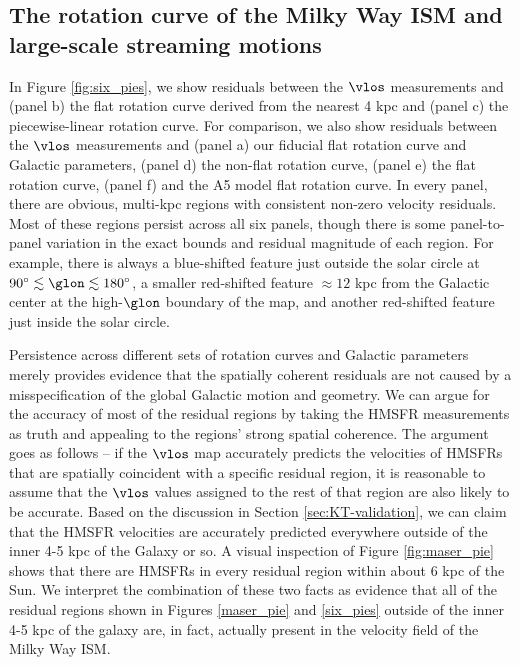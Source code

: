 \subsection{The rotation curve of the Milky Way ISM and large-scale streaming motions}
\label{sec:rotation_discussion}
In Figure \ref{fig:six_pies}, we show residuals between the $\vlos$ measurements and (panel b) the flat rotation curve derived from the nearest 4 kpc and (panel c) the piecewise-linear rotation curve. 
For comparison, we also show residuals between the $\vlos$ measurements and (panel a) our fiducial flat rotation curve and Galactic parameters, (panel d) the \Clemens non-flat rotation curve, (panel e) the \cite{2012ApJ...759..131B} flat rotation curve, (panel f) and the \Reid A5 model flat rotation curve.
In every panel, there are obvious, multi-kpc regions with consistent non-zero velocity residuals.
Most of these regions persist across all six panels, though there is some panel-to-panel variation in the exact bounds and residual magnitude of each region. 
For example, there is always a blue-shifted feature just outside the solar circle at $90^\circ \lesssim \glon \lesssim 180^\circ$, a smaller red-shifted feature $\approx 12$ kpc from the Galactic center at the high-$\glon$ boundary of the map, and another red-shifted feature just inside the solar circle. 

Persistence across different sets of rotation curves and Galactic parameters merely provides evidence that the spatially coherent residuals are not caused by a misspecification of the global Galactic motion and geometry.
We can argue for the accuracy of most of the residual regions by taking the HMSFR measurements as truth and appealing to the regions' strong spatial coherence.
The argument goes as follows -- if the $\vlos$ map accurately predicts the velocities of HMSFRs that are spatially coincident with a specific residual region, it is reasonable to assume that the $\vlos$ values assigned to the rest of that region are also likely to be accurate. 
Based on the discussion in Section \ref{sec:KT-validation}, we can claim that the HMSFR velocities are accurately predicted everywhere outside of the inner 4-5 kpc of the Galaxy or so.
A visual inspection of Figure \ref{fig:maser_pie} shows that there are HMSFRs in every residual region within about 6 kpc of the Sun. 
We interpret the combination of these two facts as evidence that all of the residual regions shown in Figures \ref{maser_pie} and \ref{six_pies} outside of the inner 4-5 kpc of the galaxy are, in fact, actually present in the velocity field of the Milky Way ISM. 
